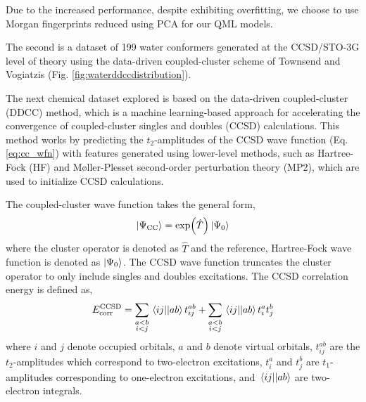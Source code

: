 \documentclass[journal=jacsat,manuscript=article]{achemso}
\begin{document}
Due to the increased performance, despite exhibiting overfitting, we choose to use Morgan fingerprints reduced using PCA for our QML models.




















The second is a dataset of 199 water conformers generated at the CCSD/STO-3G level of theory using the data-driven coupled-cluster scheme of Townsend and Vogiatzis (Fig. \ref{fig:waterddccdistribution}).\cite{townsend_data-driven_2019}









The next chemical dataset explored is based on the data-driven coupled-cluster (DDCC) method, which is a machine learning-based approach for accelerating the convergence of coupled-cluster singles and doubles (CCSD) calculations.\cite{townsend_data-driven_2019,jones_chapter_2023}
This method works by predicting the $t_{2}$-amplitudes of the CCSD wave function (Eq. \ref{eq:cc_wfn}) with features generated using lower-level methods, such as Hartree-Fock (HF) and M{\o}ller-Plesset second-order perturbation theory (MP2), which are used to initialize CCSD calculations.

The coupled-cluster wave function takes the general form,
\begin{equation}
	\ket{\Psi_{\text{CC}}} = \exp(\hat{T}) \ket{\Psi_{0}}
	\label{eq:cc_wfn}
\end{equation}
where the cluster operator is denoted as $\hat{T}$ and the reference, Hartree-Fock wave function is denoted as $\ket{\Psi_{0}}$.
The CCSD wave function truncates the cluster operator to only include singles and doubles excitations.
The CCSD correlation energy is defined as,
\begin{equation}
	E^{\text{CCSD}}_{\text{corr}} = \sum_{\substack{a<b \\ i<j}} \mel{ij}{}{ab} t^{ab}_{ij} + \sum_{\substack{a<b \\ i<j}} \mel{ij}{}{ab} t^{a}_{i} t^{b}_{j}
	\label{eq:cc_corr}
\end{equation}
where $i$ and $j$ denote occupied orbitals, $a$ and $b$ denote virtual orbitals, $t^{ab}_{ij}$ are the $t_{2}$-amplitudes which correspond to two-electron excitations, 
$t^{a}_{i}$ and $t^{b}_{j}$ are $t_{1}$-amplitudes corresponding to one-electron excitations, and $\mel{ij}{}{ab}$ are two-electron integrals.
\end{document}
